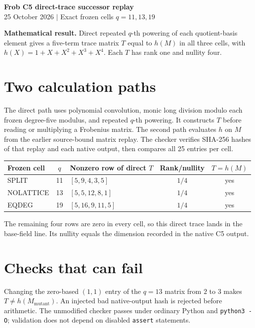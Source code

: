 \documentclass[10pt,letterpaper]{article}
\begin{document}
\begin{center}
{\Large\bfseries Frob C5 direct-trace successor replay}\\[3pt]
{\small 25 October 2026 \quad $\vert$ \quad Exact frozen cells $q=11,13,19$}
\end{center}

\noindent\colorbox{green!12}{\parbox{\dimexpr\linewidth-2\fboxsep\relax}{\textbf{Mathematical result.} Direct repeated $q$-th powering of each quotient-basis element gives a five-term trace matrix $T$ equal to $h(M)$ in all three cells, with $h(X)=1+X+X^2+X^3+X^4$. Each $T$ has rank one and nullity four.}}

\section*{Two calculation paths}

The direct path uses polynomial convolution, monic long division modulo each frozen degree-five modulus, and repeated $q$-th powering. It constructs $T$ before reading or multiplying a Frobenius matrix. The second path evaluates $h$ on $M$ from the earlier source-bound matrix replay. The checker verifies SHA-256 hashes of that replay and each native output, then compares all 25 entries per cell.

\begin{center}
\small
\begin{tabular}{@{}lclcc@{}}
\toprule
Frozen cell & $q$ & Nonzero row of direct $T$ & Rank/nullity & $T=h(M)$ \\
\midrule
SPLIT & 11 & $[5,9,4,3,5]$ & $1/4$ & yes \\
NOLATTICE & 13 & $[5,5,12,8,1]$ & $1/4$ & yes \\
EQDEG & 19 & $[5,16,9,11,5]$ & $1/4$ & yes \\
\bottomrule
\end{tabular}
\end{center}

The remaining four rows are zero in every cell, so this direct trace lands in the base-field line. Its nullity equals the dimension recorded in the native C5 output.

\section*{Checks that can fail}

Changing the zero-based $(1,1)$ entry of the $q=13$ matrix from $2$ to $3$ makes $T\ne h(M_{\mathrm{mutant}})$. An injected bad native-output hash is rejected before arithmetic. The unmodified checker passes under ordinary Python and \texttt{python3 -O}; validation does not depend on disabled \texttt{assert} statements.
\end{document}
